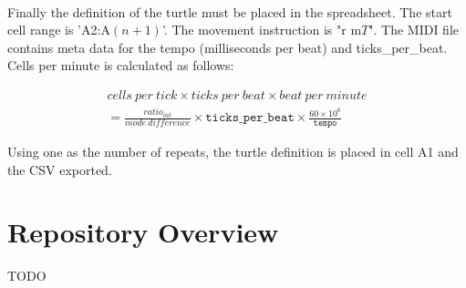 \paragraph{} Finally the definition of the turtle must be placed in the spreadsheet. The start cell range is 'A2:A$(n+1)$'. The movement instruction is "r m$T$". The MIDI file contains meta data for the tempo (milliseconds per beat) and ticks\_per\_beat. Cells per minute is calculated as follows:

\begin{align*}
  cells\ per\ tick \times ticks\ per\ beat \times beat\ per\ minute \\
  = \frac{ratio_{int}}{mode\ difference} \times \texttt{ticks\_per\_beat} \times \frac{60 \times 10^6}{\texttt{tempo}}
\end{align*}

Using one as the number of repeats, the turtle definition is placed in cell A1 and the CSV exported.

\section{Repository Overview}

TODO

